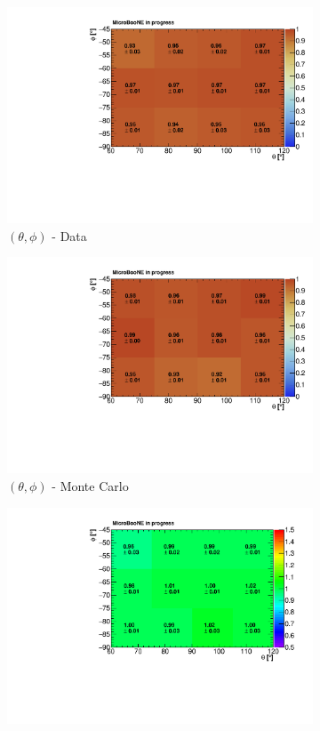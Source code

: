 \documentclass[a4paper]{scrartcl}
\begin{document}
\begin{figure}[htbp]
  \begin{subfigure}{0.33\textwidth}
    \includegraphics[width=\linewidth]{figures/e_theta_phi.pdf}
    \caption{$(\theta,\phi)$ - Data}
  \end{subfigure}\begin{subfigure}{0.33\textwidth}
  \includegraphics[width=\linewidth]{figures/theta_phi_mc.pdf}
  \caption{$(\theta,\phi)$ - Monte Carlo}
  \end{subfigure}\begin{subfigure}{0.33\textwidth}
  \includegraphics[width=\linewidth]{figures/theta_phi.pdf}

\end{subfigure}
\end{figure}
\end{document}

